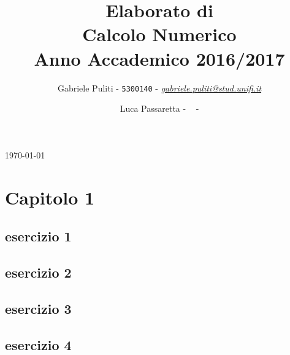 \documentclass[11pt]{extarticle}
\title{\vspace{2cm}Elaborato di\\ \textbf{Calcolo Numerico}\\ Anno Accademico 2016/2017\vspace{1cm}}
\author{Gabriele Puliti - \texttt{5300140} - \href{mailto:gabriele.puliti@stud.unifi.it}{\textit{gabriele.puliti@stud.unifi.it}}
\and Luca Passaretta - \texttt{ } - \href{mailto: }{\textit{ }}}
\date{}
\begin{document}
\maketitle
\begin{center}
\today{}
\end{center}

\newpage

\tableofcontents
\newpage

\section{Capitolo 1}
\subsection{esercizio 1}

\newpage
\subsection{esercizio 2}

\newpage
\subsection{esercizio 3}

\newpage
\subsection{esercizio 4}

\newpage
\end{document}
